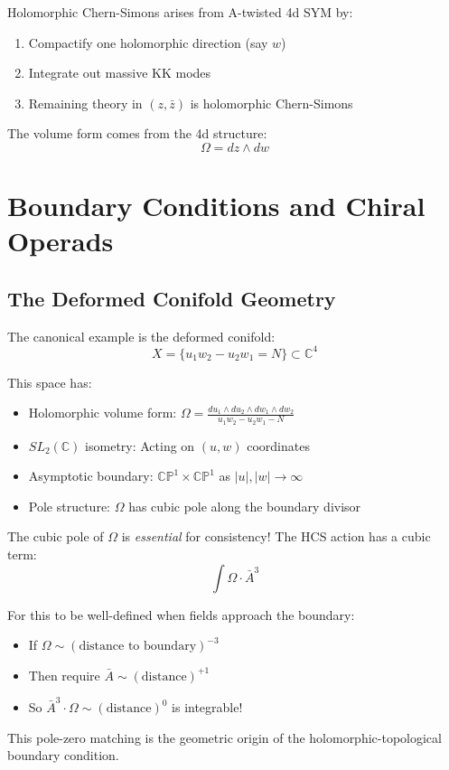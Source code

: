 \begin{theorem}
Holomorphic Chern-Simons arises from A-twisted 4d SYM by:
\begin{enumerate}
\item Compactify one holomorphic direction (say $w$)
\item Integrate out massive KK modes
\item Remaining theory in $(z, \bar{z})$ is holomorphic Chern-Simons
\end{enumerate}

The volume form comes from the 4d structure:
$$\Omega = dz \wedge dw$$
\end{theorem}

\section{Boundary Conditions and Chiral Operads}

\subsection{The Deformed Conifold Geometry}

\begin{example}
The canonical example is the deformed conifold:
$$X = \{u_1 w_2 - u_2 w_1 = N\} \subset \mathbb{C}^4$$

This space has:
\begin{itemize}
\item Holomorphic volume form: $\Omega = \frac{du_1 \wedge du_2 \wedge dw_1 
\wedge dw_2}{u_1 w_2 - u_2 w_1 - N}$
\item $SL_2(\mathbb{C})$ isometry: Acting on $(u, w)$ coordinates
\item Asymptotic boundary: $\mathbb{CP}^1 \times \mathbb{CP}^1$ as $|u|, |w| 
\to \infty$
\item Pole structure: $\Omega$ has cubic pole along the boundary divisor
\end{itemize}
\end{example}

\begin{remark}
The cubic pole of $\Omega$ is \emph{essential} for consistency! The HCS action 
has a cubic term:
$$\int \Omega \cdot \bar{A}^3$$

For this to be well-defined when fields approach the boundary:
\begin{itemize}
\item If $\Omega \sim (\text{distance to boundary})^{-3}$
\item Then require $\bar{A} \sim (\text{distance})^{+1}$
\item So $\bar{A}^3 \cdot \Omega \sim (\text{distance})^{0}$ is integrable!
\end{itemize}

This pole-zero matching is the geometric origin of the holomorphic-topological 
boundary condition.
\end{remark}

